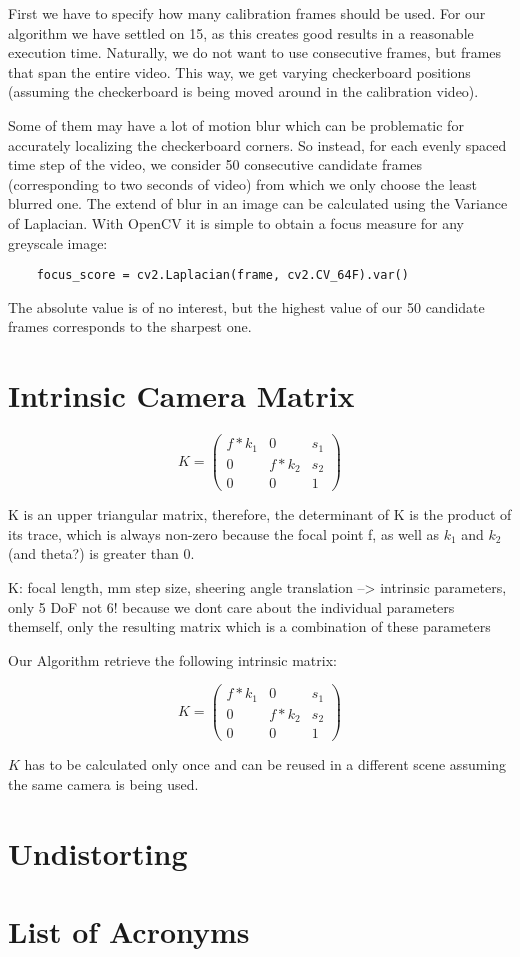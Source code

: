 \documentclass[bibliography=totoc]{scrartcl}
\begin{document}
First we have to specify how many calibration frames should be used. 
For our algorithm we have settled on 15, as this creates good results in a reasonable execution time.
Naturally, we do not want to use consecutive frames, but frames that span the entire video. 
This way, we get varying checkerboard positions (assuming the checkerboard is being moved around in the calibration video).

Some of them may have a lot of motion blur which can be problematic for accurately localizing the checkerboard corners.
So instead, for each evenly spaced time step of the video, we consider 50 consecutive candidate frames (corresponding to two seconds of video) from which we only choose the least blurred one.
The extend of blur in an image can be calculated using the Variance of Laplacian. \cite{BlurDetection}
With OpenCV it is simple to obtain a focus measure for any greyscale image:

\begin{lstlisting}
    focus_score = cv2.Laplacian(frame, cv2.CV_64F).var()
\end{lstlisting}

The absolute value is of no interest, but the highest value of our 50 candidate frames corresponds to the sharpest one.

\section{Intrinsic Camera Matrix}
$$
K =
\begin{pmatrix}
    f * k_1 & 0 & s_1 \\
    0 & f * k_2 & s_2 \\
    0 & 0 & 1
\end{pmatrix}
$$


K is an upper triangular matrix, therefore, the determinant of K is the product of its trace, which is always non-zero because the focal point f, as well as $k_1$ and $k_2$ (and theta?) is greater than 0.

K: focal length, mm step size, sheering angle translation --> intrinsic parameters, only 5 DoF not 6! because we dont care about the individual parameters themself, only the resulting matrix which is a combination of these parameters


Our Algorithm retrieve the following intrinsic matrix:

$$
K =
\begin{pmatrix}
    f * k_1 & 0 & s_1 \\
    0 & f * k_2 & s_2 \\
    0 & 0 & 1
\end{pmatrix}
$$

$K$ has to be calculated only once and can be reused in a different scene assuming the same camera is being used.


\section{Undistorting}



\clearpage
\section*{List of Acronyms}



\end{document}
